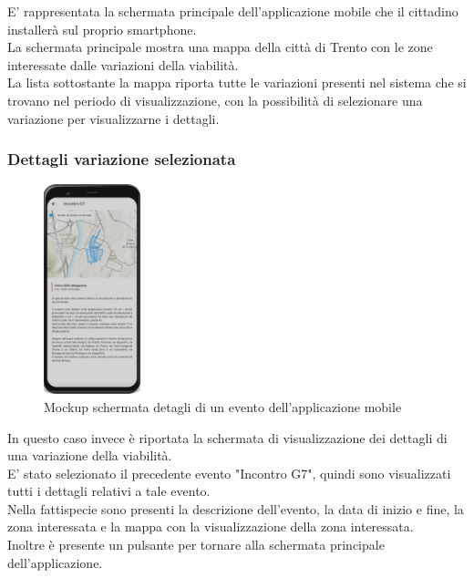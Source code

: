 \documentclass{article}
\begin{document}
E' rappresentata la schermata principale dell'applicazione mobile che il cittadino installerà sul proprio smartphone.\\
La schermata principale mostra una mappa della città di Trento con le zone interessate dalle variazioni della viabilità.\\
La lista sottostante la mappa riporta tutte le variazioni presenti nel sistema che si trovano nel periodo di visualizzazione, con la possibilità di selezionare una variazione per visualizzarne i dettagli.\\
\clearpage

\subsubsection{Dettagli variazione selezionata}
\begin{figure}[htbp]
    \label{fig:Dettaglio_evento}
    \centering
    \includegraphics[width=0.25\textwidth]{Images/Mockup2 - Mobile.png}
    \caption{Mockup schermata detagli di un evento dell'applicazione mobile}
\end{figure}

In questo caso invece è riportata la schermata di visualizzazione dei dettagli di una variazione della viabilità.\\
E' stato selezionato il precedente evento "Incontro G7", quindi sono visualizzati tutti i dettagli relativi a tale evento.\\
Nella fattispecie sono presenti la descrizione dell'evento, la data di inizio e fine, la zona interessata e la mappa con la visualizzazione della zona interessata.\\
Inoltre è presente un pulsante per tornare alla schermata principale dell'applicazione.\\
\clearpage
\end{document}
